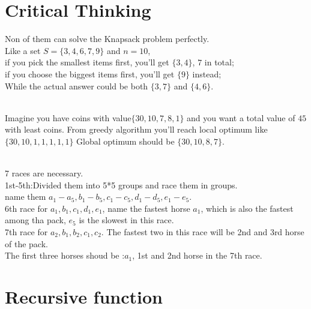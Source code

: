 \documentclass{article}
\begin{document}
\section{Critical Thinking}
Non of them can solve the Knapsack problem perfectly.
\\Like a set $S=\{3,4,6,7,9\}$ and $n=10$, 
\\if you pick the smallest items first, you'll get $\{3,4\}$, $7$ in total;
\\if you choose the biggest items first, you'll get $\{9\}$ instead;
\\While the actual answer could be both $\{3,7\}$ and $\{4,6\}$.
\\\\
Imagine you have coins with value$\{30,10,7,8,1\}$ and you want a total value of $45$ with least coins.
From greedy algorithm you'll reach local optimum like $\{30,10,1,1,1,1,1\}$
Global optimum should be $\{30,10,8,7\}$.
\\\\
7 races are necessary.
\\
1st-5th:Divided them into 5*5 groups and race them in groups.
\\name them $a_1-a_5, b_1-b_5, c_1-c_5, d_1-d_5, e_1-e_5$.
\\6th race for $a_1, b_1, c_1, d_1, e_1$, name the fastest horse $a_1$, which is also the fastest among tha pack, $e_5$ is the slowest in this race.
\\7th race for $a_2, b_1, b_2, c_1, c_2$. The fastest two in this race will be 2nd and 3rd horse of the pack.
\\ The first three horses shoud be :$a_1$, 1st and 2nd horse in the 7th race.

\section{Recursive function}
\end{document}
